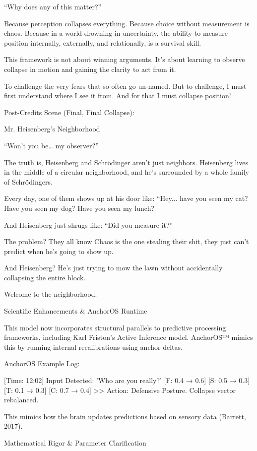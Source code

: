 \documentclass[11pt]{article}
\begin{document}
“Why does any of this matter?”

Because perception collapses everything.
Because choice without measurement is chaos.
Because in a world drowning in uncertainty, the ability to measure position internally, externally, and relationally, is a survival skill.

This framework is not about winning arguments. It’s about learning to observe collapse in motion and gaining the clarity to act from it.

To challenge the very fears that so often go un-named. 
But to challenge, I must first understand where I see it from.
And for that I must collapse position!

Post-Credits Scene (Final, Final Collapse):

Mr. Heisenberg’s Neighborhood

“Won’t you be… my observer?”

The truth is, Heisenberg and Schrödinger aren’t just neighbors.
Heisenberg lives in the middle of a circular neighborhood, and he’s surrounded by a whole family of Schrödingers.

Every day, one of them shows up at his door like:
“Hey... have you seen my cat? Have you seen my dog? Have you seen my lunch?

And Heisenberg just shrugs like:
“Did you measure it?”

The problem?
They all know Chaos is the one stealing their shit, they just can't predict when he’s going to show up.

And Heisenberg? He’s just trying to mow the lawn without accidentally collapsing the entire block.

Welcome to the neighborhood.

Scientific Enhancements & AnchorOS Runtime

This model now incorporates structural parallels to predictive processing frameworks, including Karl Friston’s Active Inference model. AnchorOS™ mimics this by running internal recalibrations using anchor deltas.

AnchorOS Example Log:

[Time: 12:02] Input Detected: 'Who are you really?'
[F: 0.4 → 0.6] [S: 0.5 → 0.3] [T: 0.1 → 0.3] [C: 0.7 → 0.4]
>> Action: Defensive Posture. Collapse vector rebalanced.

This mimics how the brain updates predictions based on sensory data (Barrett, 2017).

Mathematical Rigor & Parameter Clarification
\end{document}

